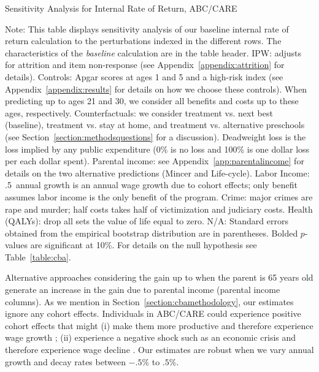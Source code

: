 \begin{table}
\begin{threeparttable}
\caption{Sensitivity Analysis for Internal Rate of Return, ABC/CARE}
\label{table:irrsens}
\centering
\footnotesize

\begin{tablenotes}
\footnotesize
\item Note: This table displays sensitivity analysis of our baseline internal rate of return calculation to the perturbations indexed in the different rows. The characteristics of the \textit{baseline} calculation are in the table header. IPW: adjusts for attrition and item non-response (see Appendix~\ref{appendix:attrition} for details). Controls: Apgar scores at ages 1 and 5 and a high-risk index (see Appendix~\ref{appendix:results} for details on how we choose these controls). When predicting up to ages 21 and 30, we consider all benefits and costs up to these ages, respectively. Counterfactuals: we consider treatment vs. next best (baseline), treatment vs. stay at home, and treatment vs. alternative preschools (see Section~\ref{section:methodsquestions} for a discussion). Deadweight loss is the loss implied by any public expenditure (0\% is no loss and 100\% is one dollar loss per each dollar spent). Parental income: see Appendix~\ref{app:parentalincome} for details on the two alternative predictions (Mincer and Life-cycle). Labor Income: .5\ annual growth is an annual wage growth due to cohort effects; only benefit assumes labor income is the only benefit of the program. Crime: major crimes are rape and murder; half costs takes half of victimization and judiciary costs. Health (QALYs): drop all sets the value of life equal to zero. N/A: Standard errors obtained from the empirical bootstrap distribution are in parentheses. Bolded $p$-values are significant at 10\%. For details on the null hypothesis see Table~\ref{table:cba}.
\end{tablenotes}
\end{threeparttable}
\end{table}
\restoregeometry
\doublespacing

Alternative approaches considering the gain up to when the parent is 65 years old generate an increase in the gain due to parental income (parental income columns). As we mention in Section~\ref{section:cbamethodology}, our estimates ignore any cohort effects. Individuals in ABC/CARE could experience positive cohort effects that might (i) make them more productive and therefore experience wage growth \citep{Lagakos_Moll_etal_2016_LifeCycle_NBER}; (ii) experience a negative shock such as an economic crisis and therefore experience wage decline \citep{Jarosch_2016_JobSecurity_Econometrica}. Our estimates are robust when we vary annual growth and decay rates between $-.5\%$ to $.5\%$.

